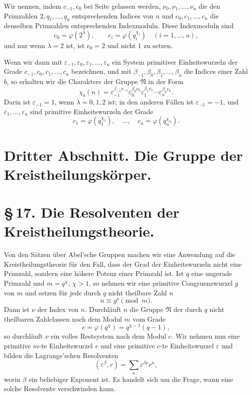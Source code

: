 \documentclass[11pt]{article}
\providecommand{\grpN}{\mathfrak N}
\begin{document}
Wir nennen, indem $c_{-1},c_0$ bei Seite gelassen werden, $\nu_0,\nu_1,
\ldots,\nu_u$ die den Primzahlen $2,q_1,
\ldots,q_u$ entsprechenden Indices von $n$ und $c_0,c_1,
\ldots,c_u$ die denselben Primzahlen entsprechenden Indexmoduln. Diese Indexmoduln sind
\[
 c_0=\varphi(2^\lambda),\qquad c_i=\varphi(q_i^{\chi_i})\quad(i=1,
\ldots,u),
\]
und nur wenn $\lambda=2$ ist, ist $c_0=2$ und nicht $1$ zu setzen.

Wenn wir dann mit $\varepsilon_{-1},\varepsilon_0,\varepsilon_1,
\ldots,\varepsilon_u$ ein System primitiver Einheitswurzeln der Grade $c_{-1},c_0,c_1,
\ldots,c_u$ bezeichnen, und mit $\beta_{-1},\beta_0,\beta_1,
\ldots,\beta_u$ die Indices einer Zahl $b$, so erhalten wir die Charaktere der Gruppe $\grpN$ in der Form
\begin{equation}
 \chi_b(n)=\varepsilon_{-1}^{\beta_{-1}\nu_{-1}}
 \varepsilon_0^{\beta_0\nu_0}
 \varepsilon_1^{\beta_1\nu_1}\cdots
 \varepsilon_u^{\beta_u\nu_u}.
\tag{7}
\end{equation}
Darin ist $\varepsilon_{-1}=1$, wenn $\lambda=0,1,2$ ist; in den anderen Fällen ist $\varepsilon_{-1}=-1$, und $\varepsilon_1,
\ldots,
\varepsilon_u$ sind primitive Einheitswurzeln der Grade
\[
 c_1=\varphi(q_1^{\chi_1}),\quad\ldots,
\quad c_u=\varphi(q_u^{\chi_u}).
\]

\section*{Dritter Abschnitt. Die Gruppe der Kreistheilungskörper.}

\section*{\S\,17. Die Resolventen der Kreistheilungstheorie.}

Von den Sätzen über Abel'sche Gruppen machen wir eine Anwendung auf die Kreistheilungstheorie für den Fall, dass der Grad der Einheitswurzeln nicht eine Primzahl, sondern eine höhere Potenz einer Primzahl ist. Ist $q$ eine ungerade Primzahl und
$m=q^\chi$, $\chi>1$, so nehmen wir eine primitive Congruenzwurzel $g$ von $m$ und setzen für jede durch $q$ nicht theilbare Zahl $n$
\begin{equation}
 n\equiv g^\nu\pmod m.
\tag{1}
\end{equation}
Dann ist $\nu$ der Index von $n$. Durchläuft $n$ die Gruppe $\grpN$ der durch $q$ nicht theilbaren Zahlclassen nach dem Modul $m$ vom Grade
\begin{equation}
 c=\varphi(q^\chi)=q^{\chi-1}(q-1),
\tag{2}
\end{equation}
so durchläuft $\nu$ ein volles Restsystem nach dem Modul $c$. Wir nehmen nun eine primitive $m$-te Einheitswurzel $r$ und eine primitive $c$-te Einheitswurzel $\varepsilon$ und bilden die Lagrange'schen Resolventen
\begin{equation}
 (\varepsilon^\beta,r)=\sum_n \varepsilon^{\beta\nu}r^n,
\tag{3}
\end{equation}
worin $\beta$ ein beliebiger Exponent ist. Es handelt sich um die Frage, wann eine solche Resolvente verschwinden kann.
\end{document}
